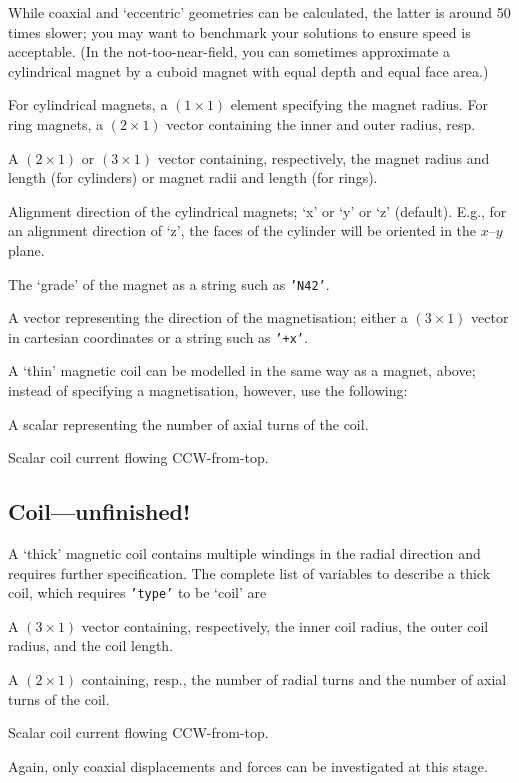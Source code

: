 \documentclass{article}
\begin{document}
While coaxial and `eccentric' geometries can be calculated, the latter is around 50 times slower; you may want to benchmark your solutions to ensure speed is acceptable. (In the not-too-near-field, you can sometimes approximate a cylindrical magnet by a cuboid magnet with equal depth and equal face area.)
\begin{description}[noitemsep,font=\ttfamily]
\item['radius'] For cylindrical magnets, a $(1\times1)$ element specifying the magnet radius. For ring magnets, a $(2\times1)$ vector containing the inner and outer radius, resp.
\item['dim'] A $(2\times1)$ or $(3\times1)$ vector containing, respectively, the magnet radius and length (for cylinders) or magnet radii and length (for rings).
\item['dir'] Alignment direction of the cylindrical magnets;
`\textsf{x}' or `\textsf{y}' or `\textsf{z}' (default).
E.g., for an alignment direction of `\textsf{z}', the faces of the cylinder will be oriented in the $x$--$y$ plane.
\item['grade'] The `grade' of the magnet as a string such as \texttt{'N42'}.
\item['magdir'] A vector representing the direction of the magnetisation; either a $(3\times1)$ vector in cartesian coordinates or a string such as \texttt{'+x'}.
\end{description}
A `thin' magnetic coil can be modelled in the same way as a magnet, above; instead of
specifying a magnetisation, however, use the following:
\begin{description}[noitemsep,font=\ttfamily]
\item['turns'] A scalar representing the number of axial turns of the coil.
\item['current'] Scalar coil current flowing CCW-from-top.
\end{description}

\subsection{Coil---unfinished!}

A `thick' magnetic coil contains multiple windings in the radial direction and requires further specification.
The complete list of variables to describe a thick coil, which requires \texttt{'type'} to be `\textsf{coil}' are
\begin{description}[noitemsep,font=\ttfamily]
\item['dim'] A $(3\times1)$ vector containing, respectively, the inner coil radius, the outer coil radius, and the coil length.
\item['turns'] A $(2\times1)$ containing, resp., the number of radial turns and the number of axial turns of the coil.
\item['current'] Scalar coil current flowing CCW-from-top.
\end{description}
Again, only coaxial displacements and forces can be investigated at this stage.
\end{document}
